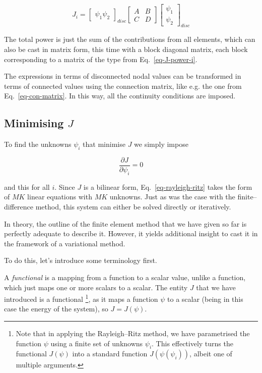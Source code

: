 \begin{equation}
J_i = \begin{bmatrix}
\psi_1 \psi_2 
\end{bmatrix}_{disc}
\begin{bmatrix}
A & B \\
C & D 
\end{bmatrix}
\begin{bmatrix}
\psi_1 \\ \psi_2
\end{bmatrix}_{disc}
\label{eq-J-power-i}
\end{equation} 

The total power is just the sum of the contributions from all elements, which can also be cast in matrix form, this time with a block diagonal matrix, each block corresponding to a matrix of the type from Eq.~\ref{eq-J-power-i}.

The expressions in terms of disconnected nodal values can be transformed in terms of connected values using the connection matrix, like e.g. the one from Eq.~\ref{eq-con-matrix}. In this way, all the continuity conditions are imposed.

\subsection{Minimising $J$}

To find the unknowns $\psi_i$ that minimise $J$ we simply impose

\begin{equation}
\frac{\partial J}{\partial \psi_i} = 0 \label{eq-rayleigh-ritz}
\end{equation} 

and this for all $i$. Since $J$ is a bilinear form, Eq.~\ref{eq-rayleigh-ritz} takes the form of $MK$ linear equations with $MK$ unknowns. Just as was the case with the finite--difference method, this system can either be solved directly or iteratively.


\pagebreak



In theory, the outline of the finite element method that we have given so far is perfectly adequate to describe it. However, it yields additional insight to cast it in the framework of a variational method.

To do this, let's introduce some terminology first.

A \emph{functional} is a mapping from a function to a scalar value, unlike a function, which just maps one or more scalars to a scalar. The entity $J$ that we have introduced is a functional \footnote{Note that in applying the Rayleigh--Ritz method, we have parametrised the function $\psi$ using a finite set of unknowns $\psi_i$. This effectively turns the functional $J(\psi)$ into a standard function $J(\psi(\psi_i))$, albeit one of multiple arguments.}, as it maps a function $\psi$ to a scalar (being in this case the energy of the system), so $J=J(\psi)$.

